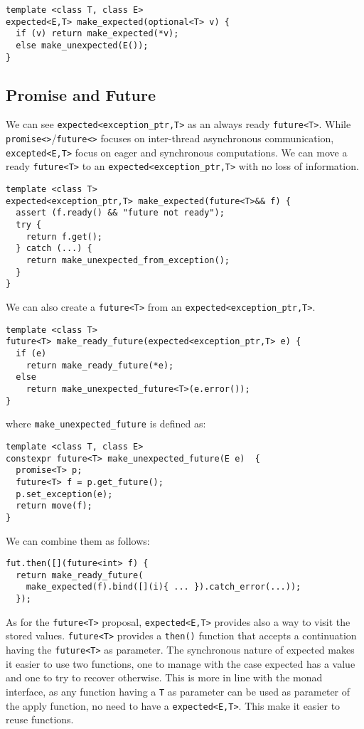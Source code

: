 \documentclass[a4paper,10pt]{article}
\newcommand{\cpp}[1]{\lstinline{#1}}
\begin{document}
\begin{lstlisting}
template <class T, class E>
expected<E,T> make_expected(optional<T> v) {
  if (v) return make_expected(*v);
  else make_unexpected(E());
}
\end{lstlisting}

\subsection{Promise and Future}

We can see \cpp{expected<exception_ptr,T>} as an always ready \cpp{future<T>}. While \cpp{promise<>}/\cpp{future<>} focuses on inter-thread asynchronous communication, \cpp{excepted<E,T>} focus on eager and synchronous computations.
We can move a ready \cpp{future<T>} to an \cpp{expected<exception_ptr,T>} with no loss of information. 

\begin{lstlisting}
template <class T>
expected<exception_ptr,T> make_expected(future<T>&& f) {
  assert (f.ready() && "future not ready");
  try {
    return f.get();
  } catch (...) {
    return make_unexpected_from_exception();
  }
}
\end{lstlisting}
\noindent
We can also create a \cpp{future<T>} from an \cpp{expected<exception_ptr,T>}.

\begin{lstlisting}
template <class T>
future<T> make_ready_future(expected<exception_ptr,T> e) {
  if (e) 
    return make_ready_future(*e);
  else 
    return make_unexpected_future<T>(e.error()); 
}
\end{lstlisting}
\noindent
where \cpp{make_unexpected_future} is defined as:

\begin{lstlisting}
template <class T, class E>
constexpr future<T> make_unexpected_future(E e)  {
  promise<T> p;
  future<T> f = p.get_future();
  p.set_exception(e);
  return move(f);
}
\end{lstlisting}
\noindent
We can combine them as follows:

\begin{lstlisting}
fut.then([](future<int> f) { 
  return make_ready_future(
    make_expected(f).bind([](i){ ... }).catch_error(...));
  });
\end{lstlisting}

As for the \cpp{future<T>} proposal, \cpp{expected<E,T>} provides also a way to visit the stored values.
\cpp{future<T>} provides a \cpp{then()} function that accepts a continuation having the \cpp{future<T>} as parameter. The synchronous nature of expected makes it easier to use two functions, one to manage with the case expected has a value and one to try to recover otherwise. This is more in line with the monad interface, as any function having a \cpp{T} as parameter can be used as parameter of the apply function, no need to have a \cpp{expected<E,T>}. This make it easier to reuse functions. 
\end{document}
